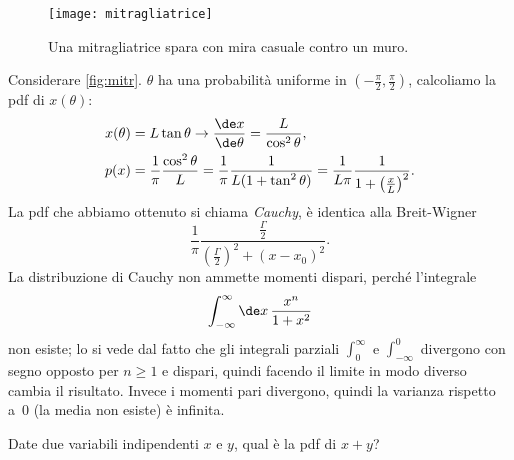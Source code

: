 \begin{figure}
	\centering
	\texttt{[image: mitragliatrice]}
	\caption{\label{fig:mitr} Una mitragliatrice spara con mira casuale contro un muro.}
\end{figure}
Considerare \autoref{fig:mitr}. $\theta$ ha una probabilità uniforme in $\left(-\frac\pi2,\frac\pi2\right)$, calcoliamo la pdf di $x(\theta)$:
\begin{align*}
	x(\theta) &= L \tan\theta \rightarrow \frac{\de x}{\de\theta} = \frac L {\cos^2\theta}, \\
	p(x) &= \frac1\pi \frac{\cos^2\theta} L = \frac1\pi\frac1{L(1+\tan^2\theta)} = \frac1{L\pi}\frac1{1+\left(\frac xL\right)^2}.
\end{align*}
La pdf che abbiamo ottenuto si chiama \emph{Cauchy}, è identica alla Breit-Wigner
\begin{equation*}
	\frac1\pi \frac {\frac\Gamma2} {\left(\frac\Gamma2\right)^2 + (x-x_0)^2}.
\end{equation*}
La distribuzione di Cauchy non ammette momenti dispari, perché l'integrale
\begin{equation*}
	\int_{-\infty}^\infty \de x\,\frac {x^n} {1+x^2}
\end{equation*}
non esiste; lo si vede dal fatto che gli integrali parziali $\int_{0}^\infty$ e $\int_{-\infty}^{0}$ divergono con segno opposto per $n \ge 1$ e dispari, quindi facendo il limite in modo diverso cambia il risultato.
Invece i momenti pari divergono, quindi la varianza rispetto a~0 (la media non esiste) è infinita.

\begin{exercise}
	Date due variabili indipendenti $x$ e $y$, qual è la pdf di $x+y$?
\end{exercise}

